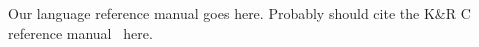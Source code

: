 Our language reference manual goes here.
Probably should cite the K\&R C reference manual~\cite{DBLP:books/ph/KernighanR88} here.
